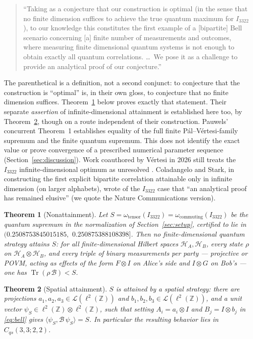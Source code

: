 \documentclass[11pt]{article}
\newtheorem{theorem}{Theorem}
\theoremstyle{remark}
\newcommand{\Cqs}{C_{qs}}
\newcommand{\B}{\mathcal{B}}
\begin{document}
\begin{quote}
``Taking as a conjecture that our construction is optimal (in the sense that
no finite dimension suffices to achieve the true quantum maximum for
$I_{3322}$), to our knowledge this constitutes the first example of a
[bipartite] Bell scenario concerning [a] finite number of measurements and
outcomes, where measuring finite dimensional quantum systems is not enough to
obtain exactly all quantum correlations. \dots\ We pose it as a challenge to
provide an analytical proof of our conjecture.'' \cite{PalVertesi}
\end{quote}

The parenthetical is a definition, not a second conjunct: to conjecture that
the construction is ``optimal'' is, in their own gloss, to conjecture that no
finite dimension suffices. Theorem~\ref{thm:N} below proves exactly that
statement. Their separate \emph{assertion} of infinite-dimensional
attainment is established here too, by Theorem~\ref{thm:S}, though on a route
independent of their construction. Pauwels' concurrent Theorem~1
\cite{Pauwels} establishes equality of the full finite
P\'al--V\'ertesi-family supremum and the finite quantum supremum.
This does not identify the exact value or prove convergence of a
prescribed numerical parameter sequence (Section~\ref{sec:discussion}). Work coauthored by V\'ertesi in 2026
still treats the $I_{3322}$ infinite-dimensional
optimum as unresolved \cite{Araujo}. Coladangelo and Stark, in
constructing the first explicit bipartite correlation attainable only in
infinite dimension (on larger alphabets), wrote of the $I_{3322}$ case that
``an analytical proof has remained elusive'' \cite{ColadangeloStark} (we
quote the Nature Communications version).

\begin{theorem}[Nonattainment]\label{thm:N}
Let $S=\omega_{\mathrm{tensor}}(I_{3322})=\omega_{\mathrm{commuting}}(I_{3322})$
be the quantum supremum in the normalization of
Section~\ref{sec:setup}, certified to lie in
$(0.2508753845015185,$ $0.250875388108398]$. Then no finite-dimensional
quantum strategy attains $S$: for all finite-dimensional Hilbert spaces
$\mathcal H_A,\mathcal H_B$, every state $\rho$ on
$\mathcal H_A\otimes\mathcal H_B$, and every triple of binary measurements
per party --- projective or POVM, acting as effects of the form
$F\otimes I$ on Alice's side and $I\otimes G$ on Bob's --- one has
$\operatorname{Tr}(\rho\,\B) < S$.
\end{theorem}

\begin{theorem}[Spatial attainment]\label{thm:S}
$S$ is attained by a spatial strategy: there are projections
$a_1,a_2,a_3\in\mathcal{L}(\ell^2(\mathbb{Z}))$ and
$b_1,b_2,b_3\in\mathcal{L}(\ell^2(\mathbb{Z}))$, and a unit vector
$\psi_S\in\ell^2(\mathbb{Z})\otimes\ell^2(\mathbb{Z})$, such that setting
$A_i=a_i\otimes I$ and $B_j=I\otimes b_j$ in \eqref{eq:bell} gives
$\langle\psi_S,\B\,\psi_S\rangle=S$. In particular the resulting behavior
lies in $\Cqs(3,3;2,2)$.
\end{theorem}
\end{document}
